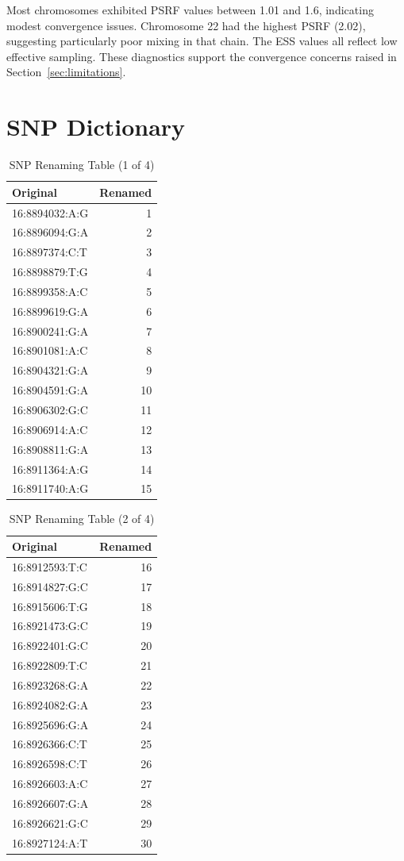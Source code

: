 \documentclass{article}\usepackage[]{graphicx}\usepackage[]{color}
\begin{document}
Most chromosomes exhibited PSRF values between 1.01 and 1.6, indicating modest convergence issues. Chromosome 22 had the highest PSRF (2.02), suggesting particularly poor mixing in that chain. The ESS values all reflect low effective sampling. These diagnostics support the convergence concerns raised in Section~\ref{sec:limitations}.

\section{SNP Dictionary}
\label{sec:supp_snp}

\begin{table}[h!]
\centering
\caption{SNP Renaming Table (1 of 4)}
\begin{tabular}{|l|r|}
\hline
\textbf{Original} & \textbf{Renamed} \\
\hline
16:8894032:A:G  & 1  \\
16:8896094:G:A  & 2  \\
16:8897374:C:T  & 3  \\
16:8898879:T:G  & 4  \\
16:8899358:A:C  & 5  \\
16:8899619:G:A  & 6  \\
16:8900241:G:A  & 7  \\
16:8901081:A:C  & 8  \\
16:8904321:G:A  & 9  \\
16:8904591:G:A  & 10 \\
16:8906302:G:C  & 11 \\
16:8906914:A:C  & 12 \\
16:8908811:G:A  & 13 \\
16:8911364:A:G  & 14 \\
16:8911740:A:G  & 15 \\
\hline
\end{tabular}
\end{table}

\begin{table}[h!]
\centering
\caption{SNP Renaming Table (2 of 4)}
\begin{tabular}{|l|r|}
\hline
\textbf{Original} & \textbf{Renamed} \\
\hline
16:8912593:T:C  & 16 \\
16:8914827:G:C  & 17 \\
16:8915606:T:G  & 18 \\
16:8921473:G:C  & 19 \\
16:8922401:G:C  & 20 \\
16:8922809:T:C  & 21 \\
16:8923268:G:A  & 22 \\
16:8924082:G:A  & 23 \\
16:8925696:G:A  & 24 \\
16:8926366:C:T  & 25 \\
16:8926598:C:T  & 26 \\
16:8926603:A:C  & 27 \\
16:8926607:G:A  & 28 \\
16:8926621:G:C  & 29 \\
16:8927124:A:T  & 30 \\
\hline
\end{tabular}
\end{table}
\end{document}
